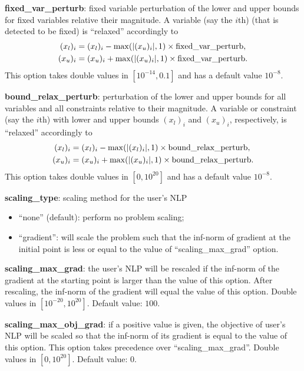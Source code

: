 \noindent \textbf{fixed\_var\_perturb}: fixed variable perturbation of the lower and upper bounds for fixed variables relative their  magnitude. A variable (say the $i$th) (that is detected to be fixed) is ``relaxed'' accordingly to 
\begin{align*}
(x_l)_i & =  (x_l)_i -  \max(|(x_u)_i|,1) \times \textnormal{fixed\_var\_perturb}, \\
(x_u)_i & =  (x_u)_i +  \max(|(x_u)_i|,1) \times \textnormal{fixed\_var\_perturb}.
\end{align*}
This option takes double values in $[10^{-14}, 0.1]$ and has a default value $10^{-8}$.
\medskip

\noindent \textbf{bound\_relax\_perturb}: perturbation of the lower and upper bounds for all variables and all constraints relative to their magnitude. A variable or constraint (say the $i$th) with lower and upper bounds $(x_l)_i$ and $(x_u)_i$, respectively,  is ``relaxed'' accordingly to 
\begin{align*}
(x_l)_i & =  (x_l)_i -  \max(|(x_l)_i|,1) \times \textnormal{bound\_relax\_perturb}, \\
(x_u)_i & =  (x_u)_i +  \max(|(x_u)_i|,1) \times \textnormal{bound\_relax\_perturb}.
\end{align*}
This option takes double values in $[0, 10^{20}]$ and has a default value $10^{-8}$.
\medskip

\noindent \textbf{scaling\_type}: scaling method for the user's NLP
\begin{itemize}
\item ``none'' (default): perform no problem scaling;
\item ``gradient'':  will scale the problem such that the inf-norm of gradient at the initial point is less or equal to the value of ``scaling\_max\_grad'' option.
\end{itemize}
\medskip

\noindent \textbf{scaling\_max\_grad}: the user's NLP will be rescaled if the inf-norm of the gradient at the starting point is larger than the value of this option. After rescaling, the inf-norm of the gradient will equal the value of this option. Double values in $[10^{-20}, 10^{20}]$. Default value: $100$.
\medskip

\noindent \textbf{scaling\_max\_obj\_grad}: if a positive value is given, the objective of user's NLP will be scaled so that the inf-norm of its gradient is equal to the value of this option. This option takes precedence over ``scaling\_max\_grad''. Double values in $[0, 10^{20}]$. Default value: $0$.
\medskip

